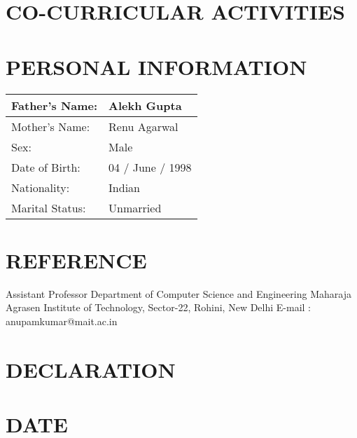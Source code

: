\documentclass[11pt,a4paper,sans]{moderncv}
\begin{document}
\section{CO-CURRICULAR ACTIVITIES}
\newpage{}

\section{PERSONAL INFORMATION}
\begin{center}
	\begin{tabular}{ | m{5cm} | m{5cm}| }
		\hline
		Father's Name: & Alekh Gupta \\
		\hline
		Mother's Name: & Renu Agarwal\\
		\hline
		Sex: & Male \\
		\hline
		Date of Birth: & 04 / June / 1998 \\
		\hline
		Nationality: & Indian \\
		\hline
		Marital Status: & Unmarried \\
		\hline
	\end{tabular}
\end{center}

\section{REFERENCE}
{Assistant Professor \newline{} Department of Computer Science and Engineering \newline{} Maharaja Agrasen Institute of Technology, Sector-22, Rohini, New Delhi \newline{} E-mail :  anupamkumar@mait.ac.in}

\section{DECLARATION}

\section{DATE}
\end{document}
